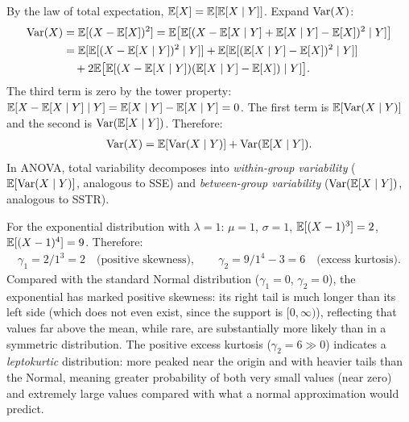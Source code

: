 \begin{solproblema}[prob:de8d740]
	By the law of total expectation, $\mathbb{E}[X]=\mathbb{E}[\mathbb{E}[X\mid Y]]$. Expand $\operatorname{Var}(X)$:
	\begin{align*}
		\operatorname{Var}(X) &= \mathbb{E}[(X-\mathbb{E}[X])^2] = \mathbb{E}\big[\mathbb{E}[(X-\mathbb{E}[X\mid Y]+\mathbb{E}[X\mid Y]-\mathbb{E}[X])^2 \mid Y]\big] \\
		&= \mathbb{E}[\mathbb{E}[(X-\mathbb{E}[X\mid Y])^2\mid Y]] + \mathbb{E}[\mathbb{E}[(\mathbb{E}[X\mid Y]-\mathbb{E}[X])^2\mid Y]] \\
		&\quad + 2\mathbb{E}\big[\mathbb{E}[(X-\mathbb{E}[X\mid Y])(\mathbb{E}[X\mid Y]-\mathbb{E}[X])\mid Y]\big].
	\end{align*}
	The third term is zero by the tower property: $\mathbb{E}[X-\mathbb{E}[X\mid Y]\mid Y]=\mathbb{E}[X\mid Y]-\mathbb{E}[X\mid Y]=0$. The first term is $\mathbb{E}[\operatorname{Var}(X\mid Y)]$ and the second is $\operatorname{Var}(\mathbb{E}[X\mid Y])$. Therefore:
	\begin{align*}
		\operatorname{Var}(X) = \mathbb{E}[\operatorname{Var}(X \mid Y)] + \operatorname{Var}(\mathbb{E}[X \mid Y]).
	\end{align*}
	In ANOVA, total variability decomposes into \emph{within-group variability} ($\mathbb{E}[\operatorname{Var}(X\mid Y)]$, analogous to SSE) and \emph{between-group variability} ($\operatorname{Var}(\mathbb{E}[X\mid Y])$, analogous to SSTR).
\end{solproblema}

\begin{solproblema}[prob:9d4a41b]
	For the exponential distribution with $\lambda=1$: $\mu=1$, $\sigma=1$, $\mathbb{E}[(X-1)^3]=2$, $\mathbb{E}[(X-1)^4]=9$. Therefore:
	\begin{align*}
		\gamma_1 = 2/1^3 = 2 \quad \text{(positive skewness)}, \qquad \gamma_2 = 9/1^4-3 = 6 \quad \text{(excess kurtosis)}.
	\end{align*}
	Compared with the standard Normal distribution ($\gamma_1=0$, $\gamma_2=0$), the exponential has marked positive skewness: its right tail is much longer than its left side (which does not even exist, since the support is $[0,\infty)$), reflecting that values far above the mean, while rare, are substantially more likely than in a symmetric distribution. The positive excess kurtosis ($\gamma_2=6 \gg 0$) indicates a \emph{leptokurtic} distribution: more peaked near the origin and with heavier tails than the Normal, meaning greater probability of both very small values (near zero) and extremely large values compared with what a normal approximation would predict.
\end{solproblema}

